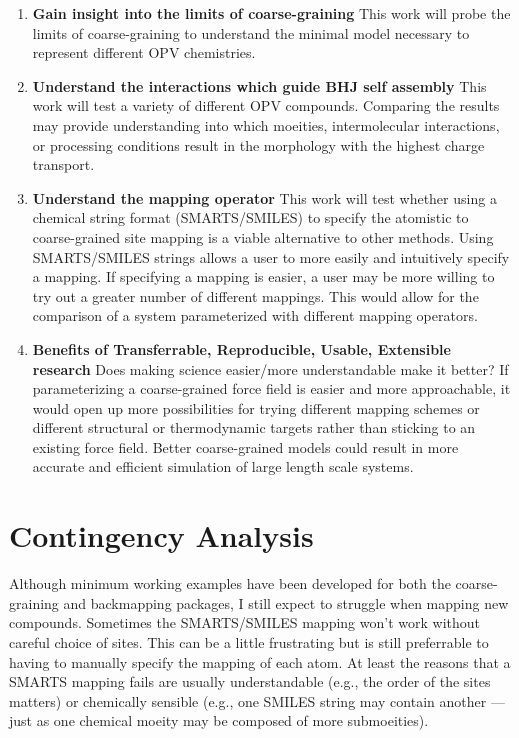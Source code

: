 \begin{enumerate}
    \item {\textbf{Gain insight into the limits of coarse-graining}}
        This work will probe the limits of coarse-graining to understand the minimal model necessary to represent different OPV chemistries.
    \item {\textbf{Understand the interactions which guide BHJ self assembly}} 
        This work will test a variety of different OPV compounds. 
        Comparing the results may provide understanding into which moeities, intermolecular interactions, or processing conditions result in the morphology with the highest charge transport.
    \item {\textbf{Understand the mapping operator}}
        This work will test whether using a chemical string format (SMARTS/SMILES) to specify the atomistic to coarse-grained site mapping is a viable alternative to other methods. 
        Using SMARTS/SMILES strings allows a user to more easily and intuitively specify a mapping.
        If specifying a mapping is easier, a user may be more willing to try out a greater number of different mappings.
        This would allow for the comparison of a system parameterized with different mapping operators.
    \item {\textbf{Benefits of Transferrable, Reproducible, Usable, Extensible research}} %
        Does making science easier/more understandable make it better? %
        If parameterizing a coarse-grained force field is easier and more approachable, it would open up more possibilities for trying different mapping schemes or different structural or thermodynamic targets rather than sticking to an existing force field.
        Better coarse-grained models could result in more accurate and efficient simulation of large length scale systems.
\end{enumerate}

\section*{Contingency Analysis}

Although minimum working examples have been developed for both the coarse-graining and backmapping packages, I still expect to struggle when mapping new compounds.
Sometimes the SMARTS/SMILES mapping won't work without careful choice of sites.
This can be a little frustrating but is still preferrable to having to manually specify the mapping of each atom.
At least the reasons that a SMARTS mapping fails are usually understandable (e.g., the order of the sites matters) or chemically sensible (e.g., one SMILES string may contain another --- just as one chemical moeity may be composed of more submoeities). %

